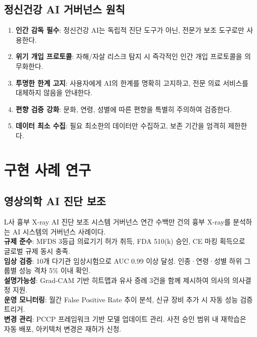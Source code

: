 \subsection{정신건강 AI 거버넌스 원칙}

\begin{enumerate}
 \item \textbf{인간 감독 필수}: 정신건강 AI는 독립적 진단 도구가 아닌, 전문가 보조 도구로만 사용한다.
 \item \textbf{위기 개입 프로토콜}: 자해/자살 리스크 탐지 시 즉각적인 인간 개입 프로토콜을 의무화한다.
 \item \textbf{투명한 한계 고지}: 사용자에게 AI의 한계를 명확히 고지하고, 전문 의료 서비스를 대체하지 않음을 안내한다.
 \item \textbf{편향 검증 강화}: 문화, 연령, 성별에 따른 편향을 특별히 주의하여 검증한다.
 \item \textbf{데이터 최소 수집}: 필요 최소한의 데이터만 수집하고, 보존 기간을 엄격히 제한한다.
\end{enumerate}

\section{구현 사례 연구}
\label{sec:16.5}

\subsection{영상의학 AI 진단 보조}

\begin{practicaltool}{L사 흉부 X-ray AI 진단 보조 시스템 거버넌스}
연간 수백만 건의 흉부 X-ray를 분석하는 AI 시스템의 거버넌스 사례이다.\\
\textbf{규제 준수}: MFDS 3등급 의료기기 허가 취득, FDA 510(k) 승인, CE 마킹 획득으로 글로벌 규제 동시 충족.\\
\textbf{임상 검증}: 10개 다기관 임상시험으로 AUC 0.99 이상 달성. 인종·연령·성별 하위 그룹별 성능 격차 5\% 이내 확인.\\
\textbf{설명가능성}: Grad-CAM 기반 히트맵과 유사 증례 3건을 함께 제시하여 의사의 의사결정 지원.\\
\textbf{운영 모니터링}: 월간 False Positive Rate 추이 분석, 신규 장비 추가 시 자동 성능 검증 트리거.\\
\textbf{변경 관리}: PCCP 프레임워크 기반 모델 업데이트 관리. 사전 승인 범위 내 재학습은 자동 배포, 아키텍처 변경은 재허가 신청.
\end{practicaltool}


